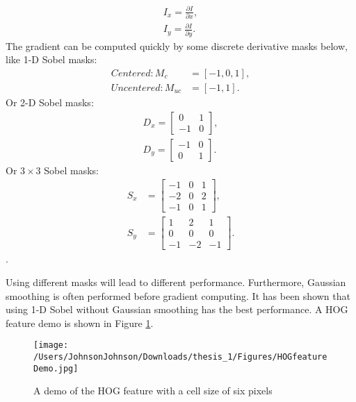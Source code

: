 \begin{equation}
\begin{aligned}
I_x = \frac{\partial I}{\partial x},\\
I_y = \frac{\partial I}{\partial y}.
\end{aligned}
\end{equation}
The gradient can be computed quickly by some discrete derivative masks below, like 1-D Sobel masks:
\begin{equation}
\begin{aligned}
Centered: M_{c} &= [-1, 0, 1],\\
Uncentered: M_{uc}& = [-1, 1].
\end{aligned}
\end{equation}
Or 2-D Sobel masks:
\begin{equation}
\begin{aligned}
D_x = \left[ \begin{matrix}
0 & 1 \\
-1& 0
\end{matrix}
\right],\\
D_y = \left[ \begin{matrix}
-1 & 0 \\
0& 1
\end{matrix}
\right].
\end{aligned}
\end{equation}
Or $3\times 3$ Sobel masks:
\begin{equation}
\begin{aligned}
S_x &= \left[ \begin{matrix}
-1 &0 & 1 \\
-2& 0 & 2\\
-1 &0 & 1 
\end{matrix}
\right],\\
S_y &= \left[ \begin{matrix}
1 & 2 &1 \\
0& 0 & 0\\
-1 & -2 &-1
\end{matrix}
\right].
\end{aligned}
\end{equation}.

Using different masks will lead to different performance. Furthermore, Gaussian smoothing is often performed before gradient computing. It has been shown that using 1-D Sobel without Gaussian smoothing has the best performance. A HOG feature demo is shown in Figure \ref{fig:HOGdemo}.
\begin{figure}[H]
\centering
\texttt{[image: /Users/JohnsonJohnson/Downloads/thesis\_1/Figures/HOGfeatureDemo.jpg]}
\caption{A demo of the HOG feature with a cell size of six pixels}
\label{fig:HOGdemo} 
\vspace{0em}
\end{figure}


